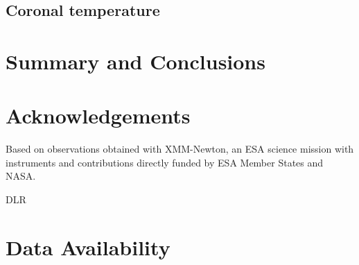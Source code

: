 \documentclass[twocolumn]{aastex631}
\begin{document}
\subsection{Coronal temperature}
\label{sec:discussion:xraytemp}




\section{Summary and Conclusions}


\section*{Acknowledgements}
\citep{lightkurvecollaboration2018lightkurve}
Based on observations obtained with XMM-Newton, an ESA science mission with instruments and contributions directly funded by ESA Member States and NASA.

DLR
\section*{Data Availability}



\end{document}
